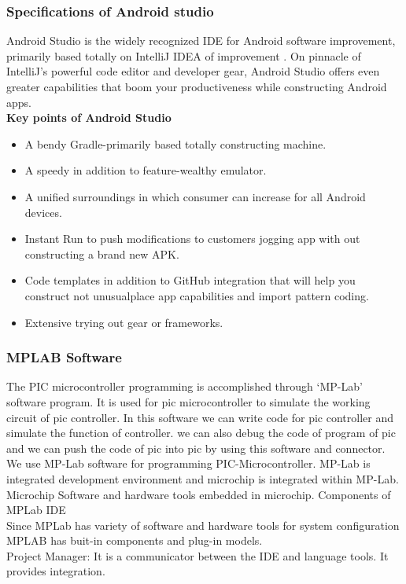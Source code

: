 \documentclass[12pt,a4paper]{article}
\begin{document}
\subsubsection{ Specifications of Android studio }
\hspace{0.5cm} Android Studio is the widely recognized IDE for Android
software improvement, primarily based totally on IntelliJ IDEA of improvement . On pinnacle of IntelliJ’s powerful
code editor and developer gear, Android Studio offers even greater capabilities that boom your
productiveness while constructing Android apps.\\

\textbf{\large{ Key points of Android Studio}}\\ 
\begin{itemize}
	\item A bendy Gradle-primarily based totally constructing machine.
	\item A speedy in addition to feature-wealthy emulator.
	\item A unified surroundings in which consumer can increase for all Android devices.
	\item Instant Run to push modifications to customers jogging app with out constructing a brand new APK.
	\item Code templates in addition to GitHub integration that will help you construct not unusualplace app capabilities and
import pattern coding.
	\item Extensive trying out gear or frameworks.
\end{itemize}

\subsubsection{MPLAB Software}
\hspace{0.5cm} The PIC microcontroller programming is accomplished through ‘MP-Lab’ software program. It is used for pic microcontroller to simulate the working circuit of pic controller. In this software we can write code for pic controller and simulate the  function of controller. we can also debug the code of program of pic and we can push the code of pic into pic by using this software and connector.\\

We use MP-Lab software for programming PIC-Microcontroller. MP-Lab is integrated development environment and microchip is integrated within MP-Lab. Microchip Software and hardware tools embedded in microchip.
Components of MPLab IDE\\
Since MPLab has variety of software and hardware tools for system configuration MPLAB has buit-in components and plug-in models.\\
Project Manager:
 It is a  communicator between the IDE and language tools. It provides integration.\\
\end{document}

